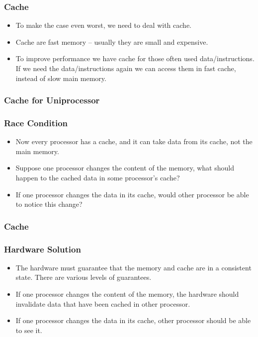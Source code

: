 \documentclass{beamer}
\begin{document}
\begin{CJK}{UTF8}{bsmi}
\begin{frame}
\frametitle{Cache}
\begin{itemize}
\item To make the case even worst, we need to deal with cache.
\item Cache are fast memory -- usually they are small and expensive.
\item To improve performance we have cache for those often used
  data/instructions.  If we need the data/instructions again we can
  access them in fast cache, instead of slow main memory.
\end{itemize}
\end{frame}

\begin{frame}
\frametitle{Cache for Uniprocessor}
\centerline{}
\end{frame}

\begin{frame}
\frametitle{Race Condition}
\begin{itemize}
\item Now every processor has a cache, and it can take data from its
  cache, not the main memory.
\item Suppose one processor changes the content of the memory, what
  should happen to the cached data in some processor's cache?
\item If one processor changes the data in its cache, would other
  processor be able to notice this change?
\end{itemize}
\end{frame}

\begin{frame}
\frametitle{Cache}
\centerline{}
\end{frame}

\begin{frame}
\frametitle{Hardware Solution}
\begin{itemize}
\item The hardware must guarantee that the memory and cache are in a
  consistent state.  There are various levels of guarantees.
\item If one processor changes the content of the memory, the hardware
  should invalidate data that have been cached in other processor.
\item If one processor changes the data in its cache, other processor
  should be able to see it.
\end{itemize}
\end{frame}


\end{CJK}
\end{document}
